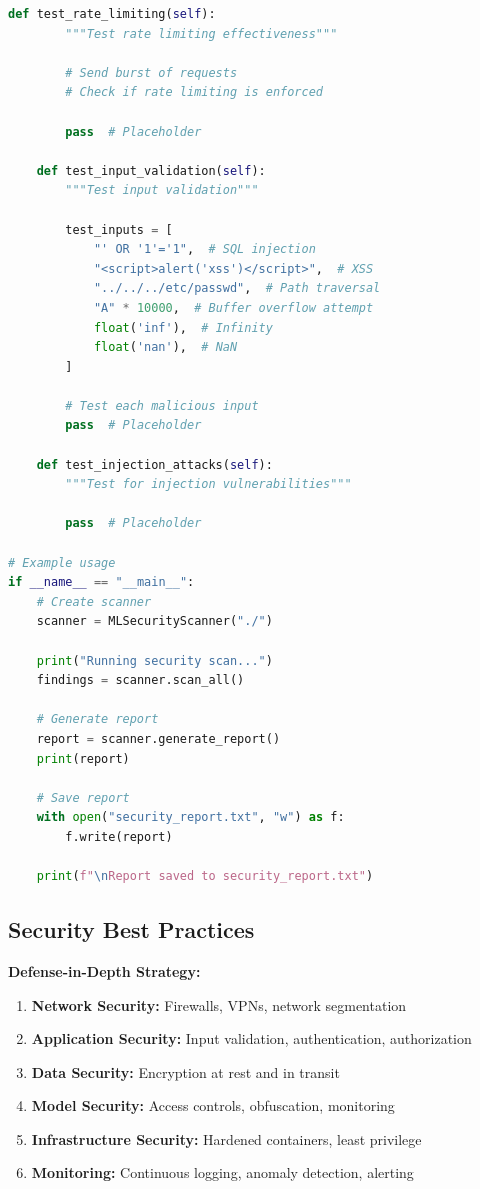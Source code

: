 \begin{lstlisting}[language=Python, caption=ML Security Vulnerability Scanner]
    def test_rate_limiting(self):
        """Test rate limiting effectiveness"""

        # Send burst of requests
        # Check if rate limiting is enforced

        pass  # Placeholder

    def test_input_validation(self):
        """Test input validation"""

        test_inputs = [
            "' OR '1'='1",  # SQL injection
            "<script>alert('xss')</script>",  # XSS
            "../../../etc/passwd",  # Path traversal
            "A" * 10000,  # Buffer overflow attempt
            float('inf'),  # Infinity
            float('nan'),  # NaN
        ]

        # Test each malicious input
        pass  # Placeholder

    def test_injection_attacks(self):
        """Test for injection vulnerabilities"""

        pass  # Placeholder

# Example usage
if __name__ == "__main__":
    # Create scanner
    scanner = MLSecurityScanner("./")

    print("Running security scan...")
    findings = scanner.scan_all()

    # Generate report
    report = scanner.generate_report()
    print(report)

    # Save report
    with open("security_report.txt", "w") as f:
        f.write(report)

    print(f"\nReport saved to security_report.txt")
\end{lstlisting}

\subsection{Security Best Practices}

\textbf{Defense-in-Depth Strategy:}
\begin{enumerate}
    \item \textbf{Network Security:} Firewalls, VPNs, network segmentation
    \item \textbf{Application Security:} Input validation, authentication, authorization
    \item \textbf{Data Security:} Encryption at rest and in transit
    \item \textbf{Model Security:} Access controls, obfuscation, monitoring
    \item \textbf{Infrastructure Security:} Hardened containers, least privilege
    \item \textbf{Monitoring:} Continuous logging, anomaly detection, alerting
\end{enumerate}

